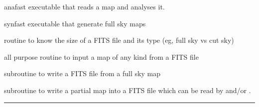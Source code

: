 \begin{related}
  \begin{sulist}{} %
  \item[anafast] executable that reads a \healpix map and analyses it. 
  \item[synfast] executable that generate full sky \healpix maps
  \item[\htmlref{getsize\_fits}{sub:getsize_fits}] routine to know the size of a FITS file and its type (eg, full sky vs cut sky)
  \item[\htmlref{input\_map}{sub:input_map}] all purpose routine to input a map of any kind from a FITS file
  \item[\htmlref{output\_map}{sub:output_map}] subroutine to write a FITS file from a full sky \healpix map
  \item[\htmlref{write\_fits\_partial}{sub:write_fits_partial}] subroutine to write a partial map into a FITS file which can be read by \thedocid{} and/or .
  \end{sulist}
\end{related}

\rule{\hsize}{2mm}

\newpage
